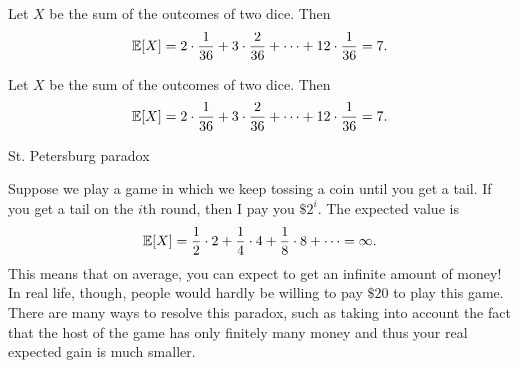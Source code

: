 \begin{note}
  \begin{field}
    \begin{eg}
      Let $X$ be the sum of the outcomes of two dice. Then
      \[
        \mathbb{E}[X] = 2\cdot \frac{1}{36} + 3\cdot \frac{2}{36} + \cdots + 12\cdot \frac{1}{36} = 7.
      \]
    \end{eg}
  \end{field}
  \begin{field}
    \begin{eg}
      Let $X$ be the sum of the outcomes of two dice. Then
      \[
        \mathbb{E}[X] = 2\cdot \frac{1}{36} + 3\cdot \frac{2}{36} + \cdots + 12\cdot \frac{1}{36} = 7.
      \]
    \end{eg}
  \end{field}
  \xplain{}%
\end{note}

%
\begin{note}
  \begin{field}
    St. Petersburg paradox
  \end{field}
  \begin{field}
    \begin{eg}
      Suppose we play a game in which we keep tossing a coin until you get a tail. If you get a tail on the $i$th round, then I pay you $\$2^i$. The expected value is
      \[
        \mathbb{E}[X] = \frac{1}{2}\cdot 2 + \frac{1}{4}\cdot 4 + \frac{1}{8}\cdot 8 + \cdots = \infty.
      \]
      This means that on average, you can expect to get an infinite amount of money! In real life, though, people would hardly be willing to pay $\$20$ to play this game. There are many ways to resolve this paradox, such as taking into account the fact that the host of the game has only finitely many money and thus your real expected gain is much smaller.
    \end{eg}
  \end{field}
  \xplain{}%
\end{note}

